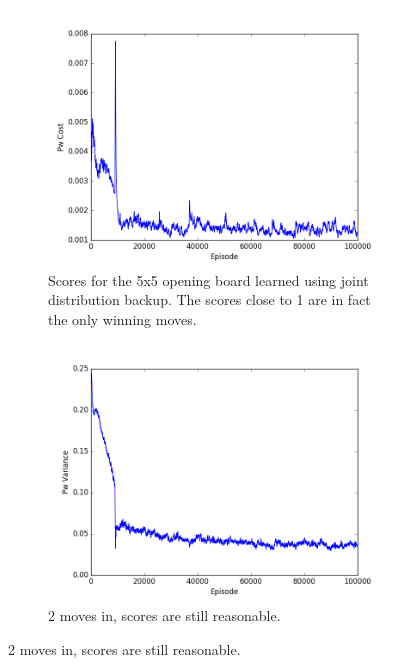 \documentclass{article}
\begin{document}
\begin{figure}[!ht]
\centering
\begin{subfigure}[t]{.45\textwidth}
  \centering
      \includegraphics[width=1\textwidth]{pics/7x7_count_Pw_cost.png}
  \caption{Scores for the 5x5 opening board learned using joint distribution backup. The scores close to 1 are in fact the only winning moves.}
  \label{fig:5x5_1}
\end{subfigure}\hfill
\begin{subfigure}[t]{.45\textwidth}
  \centering
      \includegraphics[width=1\textwidth]{pics/7x7_count_Pw_var.png}
  \caption{2 moves in, scores are still reasonable.}
  \label{fig:5x5_2}
\end{subfigure}\vfill

\end{figure}
\end{document}

